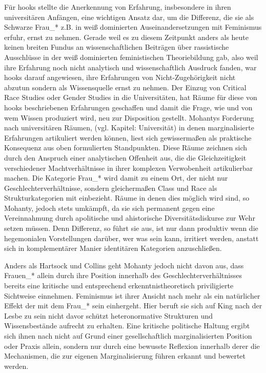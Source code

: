 Für hooks stellte die Anerkennung von Erfahrung, insbesondere in ihren
universitären Anfängen, eine wichtigen Ansatz dar, um die Differenz, die sie
als Schwarze Frau\_* z.B. in weiß dominierten Auseinandersetzungen mit
Feminismus erfuhr, ernst zu nehmen. Gerade weil es zu diesem Zeitpunkt anders
als heute keinen breiten Fundus an wissenschaftlichen Beiträgen über
rassistische Ausschlüsse in der weiß dominierten feministischen Theoriebildung
gab, also weil ihre Erfahrung noch nicht analytisch und wissenschaftlich
Ausdruck fanden, war hooks darauf angewiesen, ihre Erfahrungen von
Nicht-Zugehörigkeit nicht abzutun sondern als Wissensquelle ernst zu
nehmen.\footnotemark {}
Der Einzug von Critical Race Studies oder Gender Studies in die Universitäten,
hat Räume für diese von hooks beschriebenen Erfahrungen geschaffen und damit
die Frage, wie und von wem Wissen produziert wird, neu zur Disposition
gestellt.\footnotemark {} Mohantys Forderung nach universitären Räumen, (vgl. Kapitel: Universität)
in denen marginalisierte Erfahrungen artikuliert werden können, liest sich
gewissermaßen als praktische Konsequenz aus oben formulierten Standpunkten.
Diese Räume zeichnen sich durch den Anspruch einer analytischen Offenheit aus,
die die Gleichzeitigkeit verschiedener Machtverhältnisse in ihrer komplexen
Verwobenheit artikulierbar machen. Die Kategorie Frau\_* wird damit zu einem
Ort, der nicht nur Geschlechterverhältnisse, sondern gleichermaßen Class und
Race als Strukturkategorien mit einbezieht. Räume in denen dies möglich wird
sind, so Mohanty, jedoch stets umkämpft, da sie sich permanent gegen eine
Vereinnahmung durch apolitische und ahistorische Diversitätsdiskurse zur Wehr
setzen müssen. Denn Differenz, so führt sie aus, ist nur dann produktiv wenn
die hegemonialen Vorstellungen darüber, wer was sein kann, irritiert werden,
anstatt sich in komplementärer Manier identitären Kategorien
anzuschließen.\footnotemark {} 

Anders als Hartsock und Collins geht Mohanty jedoch nicht davon aus, dass
Frauen\_* allein durch ihre Position innerhalb des Geschlechterverhältnisses
bereits eine kritische und entsprechend erkenntnistheoretisch priviligierte
Sichtweise einnehmen. Feminismus ist ihrer Ansicht nach mehr als ein
natürlicher Effekt der mit dem Frau\_* sein einhergeht. Hier beruft sie sich auf
King nach der Lesbe zu sein nicht davor schützt heteronormative Strukturen und
Wissensbestände aufrecht zu erhalten. Eine kritische politische Haltung ergibt
sich ihnen nach nicht auf Grund einer gesellschaftlich marginalisierten
Position oder Praxis allein, sondern nur durch eine bewusste Reflexion
innerhalb derer die Mechanismen, die zur eigenen Marginalisierung führen
erkannt und bewertet werden.\footnotemark {}

